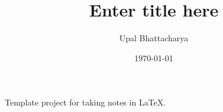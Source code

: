 \documentclass[a4paper,colorinlistoftodos]{article}
\author{Upal Bhattacharya}
\date{\today}
\title{Enter title here}
\begin{document}
\maketitle

\begingroup
    \hypersetup{linkcolor=black}
    \tableofcontents
    \pagebreak
\endgroup

\linenumbers

Template project for taking notes in \LaTeX.




\pagebreak
\nolinenumbers
\appendix


\begingroup
    \hypersetup{linkcolor=black}
    \listoftodos
    \listofchanges
    \pagebreak
\endgroup
\end{document}
